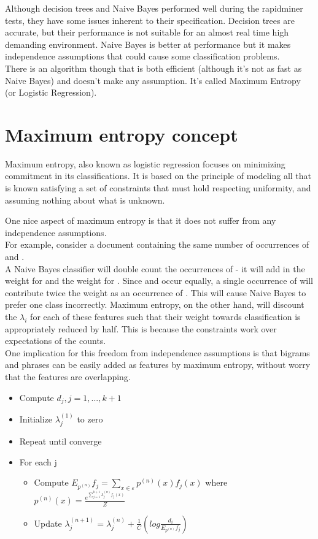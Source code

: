 Although decision trees and Naive Bayes performed well during the rapidminer tests, they have some issues inherent to their specification. Decision trees are accurate, but their performance is 
not suitable for an almost real time high demanding environment. Naive Bayes is better at performance but it makes independence assumptions that could cause some classification problems.\\
There is an algorithm though that is both efficient (although it's not as fast as Naive Bayes) and doesn't make any assumption. It's called Maximum Entropy (or Logistic Regression).

\section{Maximum entropy concept}
Maximum entropy, also known as logistic regression focuses on minimizing commitment in its classifications. It is based on the principle of modeling all that is known satisfying a set of constraints
that must hold respecting uniformity, and assuming nothing about what is unknown.

One nice aspect of maximum entropy is that it does not suffer from any independence assumptions.\\
For example, consider a document containing the same number of occurrences of  and .\\
A Naive Bayes classifier will double count the occurrences of  
- it will add in the weight for  and the weight for . Since  and
 occur equally, a single occurrence of  will contribute twice the weight as an occurrence of . This will cause Naive Bayes to prefer one class 
incorrectly.
Maximum entropy, on the other hand, will discount the $\lambda_i$ for each of these features such that their weight towards classification is appropriately reduced by half.
This is because the constraints work over expectations of the counts. \\
One implication for this freedom from independence assumptions is that bigrams and phrases can be easily added as features by maximum entropy, without worry that the features are overlapping.


\begin{itemize}
\item Compute $d_j, j=1,...,k+1$
\item Initialize $\lambda_j^{(1)}$ to zero
\item Repeat until converge
\item For each j 
  \begin{itemize}
  \item Compute $E_{p^{(n)}} f_j = \sum\limits_{x \in \varepsilon} p^{(n)} (x)f_j(x)$
    where $p^{(n)}(x) = \frac{e^{\sum\limits_{j=1}^{k+1}\lambda_j^{(n)}f_j(x)}}{Z}$ 
  \item Update $\lambda_j^{(n+1)} = \lambda_j^{(n)} + \frac{1}{C}(log\frac{d_i}{E_{{p^{(n)}}}f_j})$
  \end{itemize}
\end{itemize}

